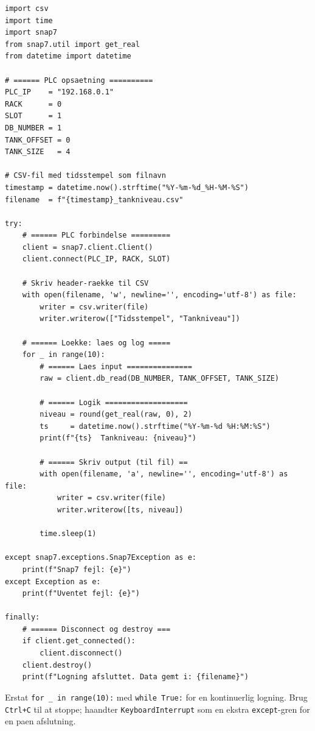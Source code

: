 \documentclass[12pt, a4paper]{article}
\begin{document}
\begin{tcolorbox}[pythonbox, title={\faPython\quad Kode 7 --- Log tankniveau fra PLC til CSV}]
\begin{verbatim}
import csv
import time
import snap7
from snap7.util import get_real
from datetime import datetime

# ====== PLC opsaetning ==========
PLC_IP    = "192.168.0.1"
RACK      = 0
SLOT      = 1
DB_NUMBER = 1
TANK_OFFSET = 0
TANK_SIZE   = 4

# CSV-fil med tidsstempel som filnavn
timestamp = datetime.now().strftime("%Y-%m-%d_%H-%M-%S")
filename  = f"{timestamp}_tankniveau.csv"

try:
    # ====== PLC forbindelse =========
    client = snap7.client.Client()
    client.connect(PLC_IP, RACK, SLOT)

    # Skriv header-raekke til CSV
    with open(filename, 'w', newline='', encoding='utf-8') as file:
        writer = csv.writer(file)
        writer.writerow(["Tidsstempel", "Tankniveau"])

    # ====== Loekke: laes og log =====
    for _ in range(10):
        # ====== Laes input ===============
        raw = client.db_read(DB_NUMBER, TANK_OFFSET, TANK_SIZE)

        # ====== Logik ===================
        niveau = round(get_real(raw, 0), 2)
        ts     = datetime.now().strftime("%Y-%m-%d %H:%M:%S")
        print(f"{ts}  Tankniveau: {niveau}")

        # ====== Skriv output (til fil) ==
        with open(filename, 'a', newline='', encoding='utf-8') as file:
            writer = csv.writer(file)
            writer.writerow([ts, niveau])

        time.sleep(1)

except snap7.exceptions.Snap7Exception as e:
    print(f"Snap7 fejl: {e}")
except Exception as e:
    print(f"Uventet fejl: {e}")

finally:
    # ====== Disconnect og destroy ===
    if client.get_connected():
        client.disconnect()
    client.destroy()
    print(f"Logning afsluttet. Data gemt i: {filename}")
\end{verbatim}
\end{tcolorbox}

\begin{tcolorbox}[tipbox, title={\faLightbulb\quad Tip --- Åben løkke}]
Erstat \texttt{for \_ in range(10):} med \texttt{while True:} for en
kontinuerlig logning. Brug \texttt{Ctrl+C} til at stoppe; haandter
\texttt{KeyboardInterrupt} som en ekstra \texttt{except}-gren for en
paen afslutning.
\end{tcolorbox}
\end{document}
